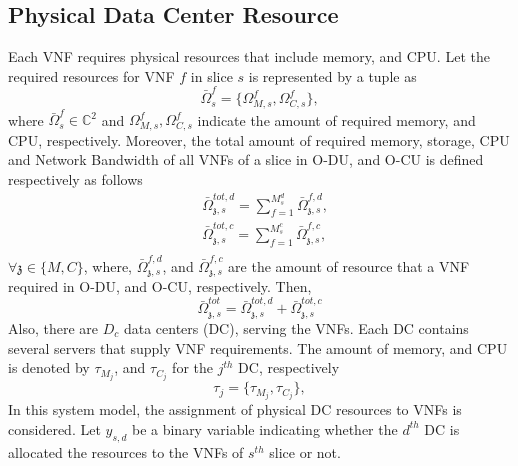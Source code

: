 \documentclass[conference]{IEEEtran}
\begin{document}
\subsection{Physical Data Center Resource}
Each VNF requires
physical resources that include memory, and CPU.
Let the required resources for VNF $f$ in slice $s$ is represented by a tuple as
\begin{equation}
\bar{\Omega}_{s}^f = \{\Omega_{M,{s}}^f, \Omega_{C,{s}}^f \},
\end{equation}
where $\bar{\Omega}_{s}^f\in \mathbb{C}^{2}$ and $\Omega_{M,{s}}^f, \Omega_{C,{s}}^f$ indicate the amount of required memory, and CPU, respectively.
Moreover, the total amount of required memory, storage, CPU and Network Bandwidth of all VNFs of a slice in O-DU, and O-CU is defined respectively as follows
\begin{equation}
\begin{split}
&\bar{\Omega}_{\mathfrak{z},s}^{tot,d} = \sum_{f=1}^{M_{s}^d}\bar{\Omega}_{\mathfrak{z},s}^{f,d},\\
&\bar{\Omega}_{\mathfrak{z},s}^{tot,c} = \sum_{f=1}^{M_{s}^c}\bar{\Omega}_{\mathfrak{z},s}^{f,c},\\
\end{split}
\end{equation}
$\forall \mathfrak{z} \in \{M, C\}$, where, $\bar{\Omega}_{\mathfrak{z},s}^{f,d}$, and $\bar{\Omega}_{\mathfrak{z},s}^{f,c}$ are the amount of resource that a VNF required in O-DU, and O-CU, respectively. Then,
\begin{equation}
 \bar{\Omega}_{\mathfrak{z},s}^{tot} = \bar{\Omega}_{\mathfrak{z},s}^{tot,d}+ \bar{\Omega}_{\mathfrak{z},s}^{tot,c}
\end{equation} 
Also, there are $D_c$ data centers (DC), serving the VNFs. Each DC contains several servers that supply VNF requirements.
The amount of memory, and CPU is denoted by $\tau_{M_{j}}$, and $\tau_{C_{j}} $ for the $j^{th}$ DC, respectively
\begin{equation*}
\tau_j = \{\tau_{M_{j}}, \tau_{C_{j}} \},
\end{equation*}
In this system model, the assignment of physical DC resources to VNFs is considered. Let $y_{s,d}$ be a binary variable indicating whether the $d^{th}$ DC is allocated the resources to the VNFs of $s^{th}$ slice or not.
\end{document}
